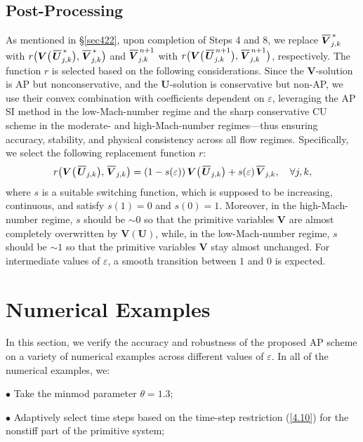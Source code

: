 \documentclass[A4paper,12pt,twoside]{article}
\numberwithin{equation}{section}
\numberwithin{figure}{section}
\numberwithin{table}{section}
\newcommand{\ve}{\varepsilon}
\newcommand\eref[1]{(\ref{#1})}
\newcommand*\xbar[1]{%
  \hbox{%
    \vbox{%
      \hrule height 0.5pt %
      \kern0.4ex%
      \hbox{%
        \kern-0.05em%
        \ensuremath{#1}%
        \kern-0.00em%
      }%
    }%
  }%
}
\begin{document}
\subsection{Post-Processing}\label{sec43}
{\color{black}As mentioned in \S\ref{sec422},} upon completion of Steps 4 and 8, we {\color{black}replace $\xbar{\bm V}^{\,*}_{j,k}$ with
$r\big(\bm V\big(\,\xbar{\bm U}^{\,*}_{j,k}\big),\,\xbar{\bm V}^{\,*}_{j,k}\big)$ and $\xbar{\bm V}^{\,n+1}_{j,k}$ with
$r\big(\bm V\big(\,\xbar{\bm U}^{\,n+1}_{j,k}\big),\,\xbar{\bm V}^{\,n+1}_{j,k}\big)$, respectively. The function $r$ is selected based on
the following considerations. Since the $\bm V$-solution is AP but nonconservative, and the $\bm U$-solution is conservative but non-AP, we
use} their convex combination with coefficients dependent on $\ve$, leveraging the AP SI method in the low-Mach-number regime and the sharp
conservative CU scheme in the moderate- and high-Mach-number regimes---thus ensuring accuracy, stability, and physical consistency across
all flow regimes. Specifically, we select the following replacement function $r$:
\begin{equation}
r\big(\bm V\big(\,\xbar{\bm U}_{j,k}\big),\,\xbar{\bm V}_{j,k}\big)=
(1-s(\ve))\,\bm V\big(\,\xbar{\bm U}_{j,k}\big)+s(\ve)\,\xbar{\bm V}_{j,k},\quad\forall j,k,
\label{star}
\end{equation}
where $s$ is a suitable switching function, which is supposed to be increasing, continuous, and satisfy $s(1)=0$ and $s(0)=1$. Moreover,
in the high-Mach-number regime, $s$ should be $\sim0$ so that the primitive variables $\bm V$ are almost completely overwritten by
$\bm V(\bm U)$, while, in the low-Mach-number regime, $s$ should be $\sim1$ so that the primitive variables $\bm V$ stay almost unchanged.
For intermediate values of $\ve$, a smooth transition between $1$ and $0$ is expected.

\section{Numerical Examples}\label{sec6}
In this section, we verify the accuracy and robustness of the proposed AP scheme on a variety of numerical examples across different values 
of $\ve$. In all of the numerical examples, we:

\smallskip
\noindent
$\bullet$ Take the minmod parameter $\theta=1.3$;

\smallskip
\noindent
$\bullet$ Adaptively select time steps based on the time-step restriction \eref{4.10} for the nonstiff part of the primitive system;
\end{document}
